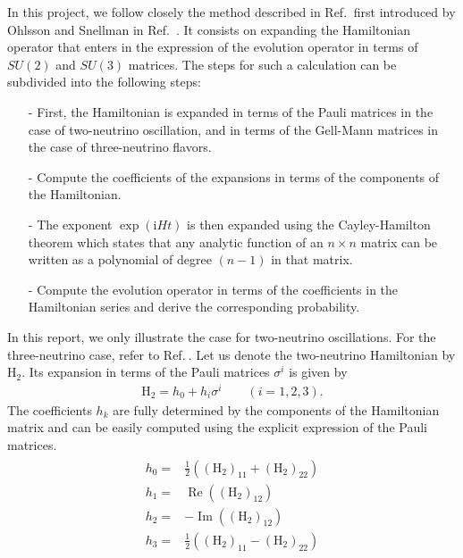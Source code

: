 \documentclass[twocolumn,secnumarabic,amssymb, nobibnotes, aps, prd,10pt]{revtex4-1}
\newcommand{\myref}[1]{Ref.$\:$\cite{#1}}
\begin{document}
In this project, we follow closely the method described in \myref{Bustamante:2019ggq} first 
introduced by Ohlsson and Snellman in Ref.~\cite{Ohlsson:1999xb, Ohlsson:1999um, Ohlsson:2001et}. 
It consists on expanding the Hamiltonian operator that enters in the expression of the evolution 
operator in terms of $SU(2)$ and $SU(3)$ matrices. The steps for such a calculation can be 
subdivided into the following steps:
\begin{itemize}
\item[-] First, the Hamiltonian is expanded in terms of the Pauli matrices in the case of
two-neutrino oscillation, and in terms of the Gell-Mann matrices in the case of 
three-neutrino flavors.
\item[-] Compute the coefficients of the expansions in terms of the components of the
Hamiltonian.
\item[-] The exponent $\exp (\mathrm{i} H t)$ is then expanded using the Cayley-Hamilton theorem
which states that any analytic function of an $n \times n$ matrix can be written as a 
polynomial of degree $(n-1)$ in that matrix.
\item[-] Compute the evolution operator in terms of the coefficients in the Hamiltonian
series and derive the corresponding probability.
\end{itemize}
In this report, we only illustrate the case for two-neutrino oscillations. For the 
three-neutrino case, refer to \myref{Bustamante:2019ggq}. Let us denote the two-neutrino Hamiltonian
by $\mathrm{H}_2$. Its expansion in terms of the Pauli matrices $\sigma^i$ is given by
\begin{align}
\mathrm{H}_2 = h_0 + h_i \sigma^i \quad \quad (i=1,2,3).
\end{align}
The coefficients $h_k$ are fully determined by the components of the Hamiltonian matrix
and can be easily computed using the explicit expression of the Pauli matrices.
\begin{align}
\begin{array}{ll}
h_{0} =& \frac{1}{2}\left(\left(\mathrm{H}_{2}\right)_{11}+\left(\mathrm{H}_{2}\right)_{22}\right) \\
h_{1} =& \operatorname{Re}\left(\left(\mathrm{H}_{2}\right)_{12}\right) \\
h_{2} =& -\operatorname{Im}\left(\left(\mathrm{H}_{2}\right)_{12}\right) \\
h_{3} =& \frac{1}{2}\left(\left(\mathrm{H}_{2}\right)_{11}-\left(\mathrm{H}_{2}\right)_{22}\right)
\end{array}
\end{align}
\end{document}
